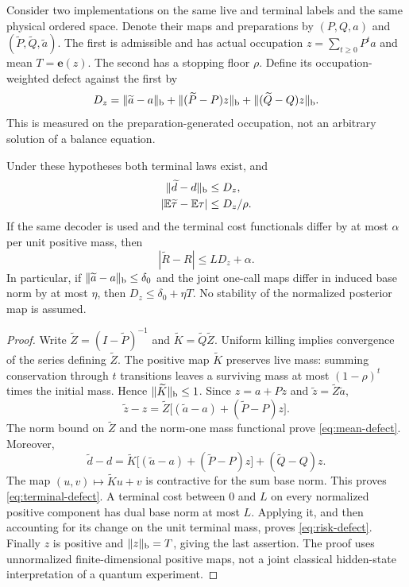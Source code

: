 Consider two implementations on the same live and terminal labels and the same physical ordered space. Denote their maps and preparations by $(P,Q,a)$ and $(\widetilde P,\widetilde Q,\widetilde a)$. The first is admissible and has actual occupation $z=\sum_{t\ge0}P^ta$ and mean $T=\boldsymbol e(z)$. The second has a stopping floor $\rho$. Define its occupation-weighted defect against the first by
\begin{equation}\label{eq:weighted-defect}
 D_z=\lVert \widetilde a-a\rVert_{\mathrm b}
       +\lVert (\widetilde P-P)z\rVert_{\mathrm b}
       +\lVert (\widetilde Q-Q)z\rVert_{\mathrm b}.
\end{equation}
This is measured on the preparation-generated occupation, not an arbitrary solution of a balance equation.

\begin{lemma}\label{lem:resolvent-error}
Under these hypotheses both terminal laws exist, and
\begin{align}
 \lVert \widetilde d-d\rVert_{\mathrm b}&\le D_z,\label{eq:terminal-defect}\\
 |\mathbb E\widetilde\tau-\mathbb E\tau|&\le D_z/\rho.\label{eq:mean-defect}
\end{align}
If the same decoder is used and the terminal cost functionals differ by at most $\alpha$ per unit positive mass, then
\begin{equation}\label{eq:risk-defect}
 |\widetilde R-R|\le LD_z+\alpha.
\end{equation}
In particular, if $\lVert \widetilde a-a\rVert_{\mathrm b}\le\delta_0$ and the joint one-call maps differ in induced base norm by at most $\eta$, then $D_z\le\delta_0+\eta T$. No stability of the normalized posterior map is assumed.
\end{lemma}
\begin{proof}
Write $\widetilde Z=(I-\widetilde P)^{-1}$ and $\widetilde K=\widetilde Q\widetilde Z$. Uniform killing implies convergence of the series defining $\widetilde Z$. The positive map $\widetilde K$ preserves live mass: summing conservation through $t$ transitions leaves a surviving mass at most $(1-\rho)^t$ times the initial mass. Hence $\lVert \widetilde K\rVert_{\mathrm b}\le1$. Since $z=a+Pz$ and $\widetilde z=\widetilde Z\widetilde a$,
\[
 \widetilde z-z=\widetilde Z\bigl[(\widetilde a-a)+(\widetilde P-P)z\bigr].
\]
The norm bound on $\widetilde Z$ and the norm-one mass functional prove \eqref{eq:mean-defect}. Moreover,
\[
 \widetilde d-d=\widetilde K\bigl[(\widetilde a-a)+(\widetilde P-P)z\bigr]
                         +(\widetilde Q-Q)z.
\]
The map $(u,v)\mapsto\widetilde Ku+v$ is contractive for the sum base norm. This proves \eqref{eq:terminal-defect}. A terminal cost between $0$ and $L$ on every normalized positive component has dual base norm at most $L$. Applying it, and then accounting for its change on the unit terminal mass, proves \eqref{eq:risk-defect}. Finally $z$ is positive and $\lVert z\rVert_{\mathrm b}=T$, giving the last assertion. The proof uses unnormalized finite-dimensional positive maps, not a joint classical hidden-state interpretation of a quantum experiment.
\end{proof}

